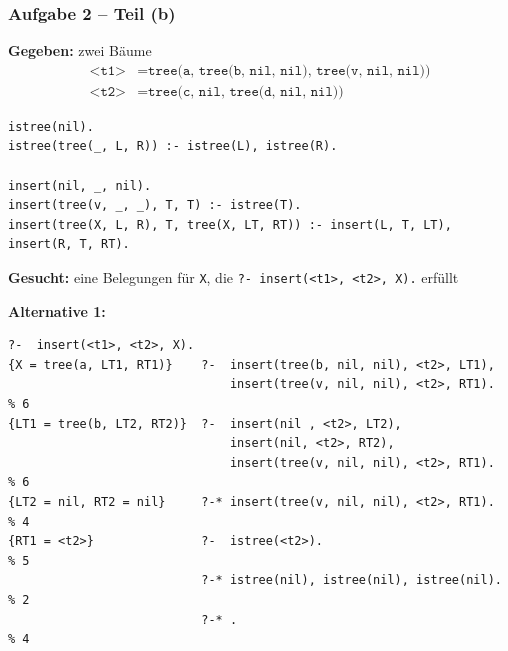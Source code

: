\documentclass{beamer}
\begin{document}
\begin{frame}[fragile] \frametitle{Aufgabe 2 -- Teil (b)}
	\scriptsize
	\textbf{Gegeben:} zwei Bäume
	\begin{align*}
		\texttt{<t1>} &= \texttt{tree(a, tree(b, nil, nil), tree(v, nil, nil))} \\
		\texttt{<t2>} &= \texttt{tree(c, nil, tree(d, nil, nil))}
	\end{align*}
	\begin{lstlisting}[basicstyle=\ttfamily\tiny]
istree(nil).
istree(tree(_, L, R)) :- istree(L), istree(R).

insert(nil, _, nil).
insert(tree(v, _, _), T, T) :- istree(T).
insert(tree(X, L, R), T, tree(X, LT, RT)) :- insert(L, T, LT), insert(R, T, RT).
	\end{lstlisting}
	\textbf{Gesucht:} eine Belegungen für \texttt{X}, die \texttt{?- insert(<t1>, <t2>, X).} erfüllt
	


	\textbf{Alternative 1:}
	\begin{lstlisting}[style=refutation, basicstyle=\ttfamily\tiny]
                           ?-  insert(<t1>, <t2>, X).
{X = tree(a, LT1, RT1)}    ?-  insert(tree(b, nil, nil), <t2>, LT1), 
                               insert(tree(v, nil, nil), <t2>, RT1).   % 6
{LT1 = tree(b, LT2, RT2)}  ?-  insert(nil , <t2>, LT2), 
                               insert(nil, <t2>, RT2), 
                               insert(tree(v, nil, nil), <t2>, RT1).   % 6
{LT2 = nil, RT2 = nil}     ?-* insert(tree(v, nil, nil), <t2>, RT1).   % 4
{RT1 = <t2>}               ?-  istree(<t2>).                           % 5
                           ?-* istree(nil), istree(nil), istree(nil).  % 2
                           ?-* .                                       % 4
	\end{lstlisting}
\end{frame}
\end{document}

